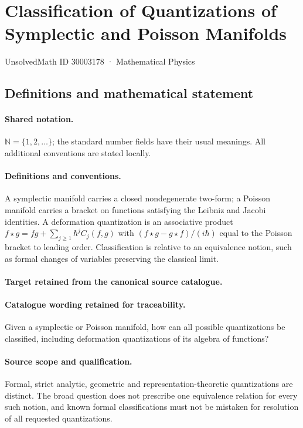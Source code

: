 \documentclass[11pt]{article}
\begin{document}
\setcounter{section}{30003177}
\section{Classification of Quantizations of Symplectic and Poisson Manifolds}\label{30003178}
{\small UnsolvedMath ID 30003178 · Mathematical Physics}
\subsection{Definitions and mathematical statement}

\paragraph{Shared notation.}$\mathbb N=\{1,2,\ldots\}$; the standard number fields have their usual meanings. All additional conventions are stated locally.


\paragraph{Definitions and conventions.}
A symplectic manifold carries a closed nondegenerate two-form; a Poisson manifold carries a bracket on functions satisfying the Leibniz and Jacobi identities. A deformation quantization is an associative product $f\star g=fg+\sum_{j\geq1}\hbar^j C_j(f,g)$ with $(f\star g-g\star f)/(i\hbar)$ equal to the Poisson bracket to leading order. Classification is relative to an equivalence notion, such as formal changes of variables preserving the classical limit.

\paragraph{Target retained from the canonical source catalogue.}
\paragraph{Catalogue wording retained for traceability.}
Given a symplectic or Poisson manifold, how can all possible quantizations be classified, including deformation quantizations of its algebra of functions?

\paragraph{Source scope and qualification.}
Formal, strict analytic, geometric and representation-theoretic quantizations are distinct. The broad question does not prescribe one equivalence relation for every such notion, and known formal classifications must not be mistaken for resolution of all requested quantizations.
\end{document}
